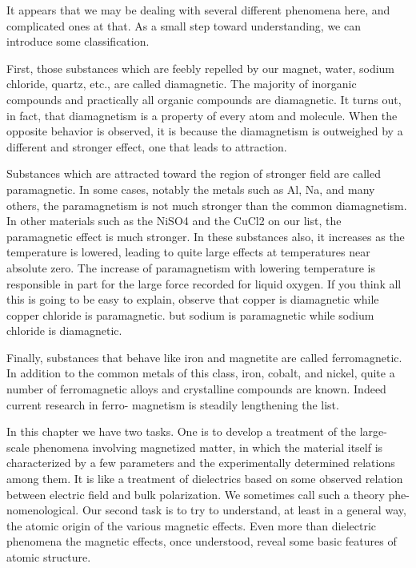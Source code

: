 { 

It appears that we may be dealing with several different phenomena
here, and complicated ones at that. As a small step toward
understanding, we can introduce some classification.

First, those substances which are feebly repelled by our magnet,
water, sodium chloride, quartz, etc., are called diamagnetic. The
majority of inorganic compounds and practically all organic compounds
are diamagnetic. It turns out, in fact, that diamagnetism
is a property of every atom and molecule. When the opposite behavior
is observed, it is because the diamagnetism is outweighed by
a different and stronger effect, one that leads to attraction.

Substances which are attracted toward the region of stronger field
are called paramagnetic. In some cases, notably the metals such as
Al, Na, and many others, the paramagnetism is not much stronger
than the common diamagnetism. In other materials such as the
NiSO4 and the CuCl2 on our list, the paramagnetic effect is much
stronger. In these substances also, it increases as the temperature
is lowered, leading to quite large effects at temperatures near absolute
zero. The increase of paramagnetism with lowering temperature
is responsible in part for the large force recorded for liquid
oxygen. If you think all this is going to be easy to explain, observe
that copper is diamagnetic while copper chloride is paramagnetic.
but sodium is paramagnetic while sodium chloride is diamagnetic.

Finally, substances that behave like iron and magnetite are called
ferromagnetic. In addition to the common metals of this class, iron,
cobalt, and nickel, quite a number of ferromagnetic alloys and
crystalline compounds are known. Indeed current research in ferro-
magnetism is steadily lengthening the list.

In this chapter we have two tasks. One is to develop a treatment
of the large-scale phenomena involving magnetized matter, in which
the material itself is characterized by a few parameters and the
experimentally determined relations among them. It is like a treatment
of dielectrics based on some observed relation between electric
field and bulk polarization. We sometimes call such a theory phe-
nomenological. Our second task is to try to understand, at least in
a general way, the atomic origin of the various magnetic effects.
Even more than dielectric phenomena the magnetic effects, once
understood, reveal some basic features of atomic structure.

}
